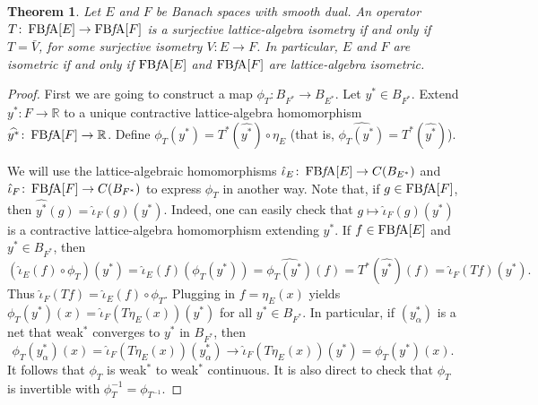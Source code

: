 \documentclass{memo-l}
\newtheorem{thm}[theorem]{Theorem}
\theoremstyle{definition}
\theoremstyle{remark}
\numberwithin{section}{chapter}
\numberwithin{equation}{chapter}
\newcommand\R{\ensuremath{\mathbb{R}}}
\newcommand{\FBFA}[1]{\operatorname{FB{\it f}\!A}[#1]}
\begin{document}
\begin{thm}\label{thm:isometries}
    Let $E$ and $F$ be Banach spaces with smooth dual. An operator
    $T\colon \FBFA E\to \FBFA F$ is a surjective lattice-algebra
    isometry if and only if $T=\bar{V}$, for some surjective isometry
    $V\colon E\to F$. In particular, $E$ and $F$ are isometric if and
    only if $\FBFA E$ and $\FBFA F$ are lattice-algebra isometric.
\end{thm}
\begin{proof}
    First we are going to construct a map $\phi _T\colon B_{F^{*}}\to
    B_{E^{*}}$. Let $y^{*}\in B_{F^{*}}$. Extend $y^{*}\colon F\to \R$
    to a unique contractive lattice-algebra homomorphism
    $\widehat{y^{*}}\colon \FBFA F\to \R$. Define $\phi_T
    (y^{*})=T^{*}(\widehat{y^{*}})\circ \eta _E$ (that is,
    $\widehat{\phi _T(y^{*})}=T^{*}(\widehat{y^{*}})$).

    We will use the
    lattice-algebraic homomorphisms $\hat{\iota}_E\colon \FBFA E\to
    C(B_{E^{*}})$ and $\hat{\iota }_F\colon \FBFA F\to
    C(B_{F^{*}})$ to express $\phi _T$ in
    another way. Note that, if $g \in \FBFA
    F$, then $\widehat{y^{*}}(g)=\hat{\iota }_F(g)(y^{*})$. Indeed,
    one can easily check that $g\mapsto \hat{\iota }_F(g)(y^{*})$
    is a contractive lattice-algebra homomorphism extending
    $y^{*}$. If $f \in \FBFA E$ and $y^{*}\in B_{F^{*}}$, then
    \[
        (\hat{\iota }_E(f)\circ \phi_T )(y^{*})=\hat{\iota
        }_E(f)(\phi _T(y^{*}))=\widehat{\phi_T
        (y^{*})}(f)=T^{*}(\widehat{y^{*}})(f)=\hat{\iota }_F(Tf)(y^{*}).
    \]
    Thus $\hat\iota _F(Tf)=\hat\iota _E(f)\circ \phi _T$. Plugging in $f=\eta _E(x)$ yields $\phi
    _T(y^{*})(x)=\hat{\iota }_F(T\eta _E(x))(y^{*})$ for all $y^{*}\in B_{F^{*}}$.
    In particular, if $(y_\alpha ^{*})$ is a net that weak$^{*}$
    converges to $y^{*}$ in $B_{F^{*}}$, then
    \[
    \phi _T(y_\alpha ^{*})(x)=\hat{\iota }_F(T\eta _E(x))(y_\alpha
    ^{*})\to \hat{\iota }_F(T\eta
    _E(x))(y^{*})=\phi _T(y^{*})(x).
    \]
    It follows that $\phi _T$ is weak$^{*}$ to weak$^{*}$ continuous.
    It is also direct to check that $\phi _T$ is invertible with $\phi
    _T^{-1}=\phi _{T^{-1}}$.


\end{proof}
\end{document}
